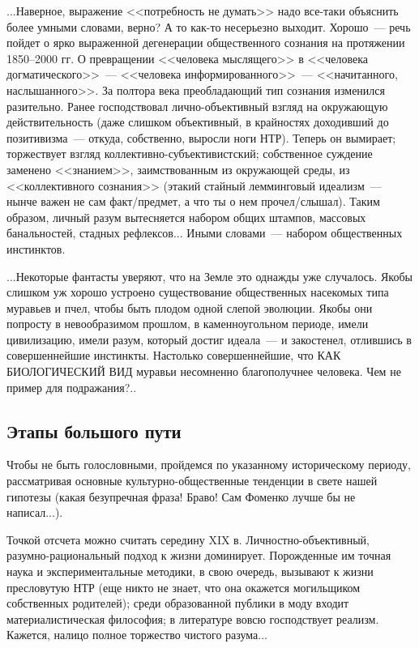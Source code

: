 \documentclass{scrbook}
\newcommand{\flqq}{<<}
\newcommand{\frqq}{>>}
\newcommand{\mdash}{~--- }
\newcommand{\ndash}{--}
\newcommand{\essaysection}[1]{\subsection*{#1}\nopagebreak}
\begin{document}
...Наверное, выражение {\flqq}потребность не думать{\frqq} надо все-таки объяснить более умными словами, верно? А то как-то несерьезно выходит. Хорошо{\mdash}речь пойдет о ярко выраженной дегенерации общественного сознания на протяжении 1850{\ndash}2000 гг. О превращении {\flqq}человека мыслящего{\frqq} в {\flqq}человека догматического{\frqq}{\mdash}{\flqq}человека информированного{\frqq}{\mdash}{\flqq}начитанного, наслышанного{\frqq}. За полтора века преобладающий тип сознания изменился разительно. Ранее господствовал лично-объективный взгляд на окружающую действительность (даже слишком объективный, в крайностях доходивший до позитивизма{\mdash}откуда, собственно, выросли ноги НТР). Теперь он вымирает; торжествует взгляд коллективно-субъективистский; собственное суждение заменено {\flqq}знанием{\frqq}, заимствованным из окружающей среды, из {\flqq}коллективного сознания{\frqq} (этакий стайный лемминговый идеализм{\mdash}нынче важен не сам факт/предмет, а что ты о нем прочел/слышал). Таким образом, личный разум вытесняется набором общих штампов, массовых банальностей, стадных рефлексов... Иными словами{\mdash}набором общественных инстинктов.

...Некоторые фантасты уверяют, что на Земле это однажды уже случалось. Якобы слишком уж хорошо устроено существование общественных насекомых типа муравьев и пчел, чтобы быть плодом одной слепой эволюции. Якобы они попросту в невообразимом прошлом, в каменноугольном периоде, имели цивилизацию, имели разум, который достиг идеала{\mdash}и закостенел, отлившись в совершеннейшие инстинкты. Настолько совершеннейшие, что КАК БИОЛОГИЧЕСКИЙ ВИД муравьи несомненно благополучнее человека. Чем не пример для подражания?..

\essaysection{Этапы большого пути}

Чтобы не быть голословными, пройдемся по указанному историческому периоду, рассматривая основные культурно-общественные тенденции в свете нашей гипотезы (какая безупречная фраза! Браво! Сам Фоменко лучше бы не написал...).

Точкой отсчета можно считать середину XIX в. Личностно-объективный, разумно-рациональный подход к жизни доминирует. Порожденные им точная наука и экспериментальные методики, в свою очередь, вызывают к жизни пресловутую НТР (еще никто не знает, что она окажется могильщиком собственных родителей); среди образованной публики в моду входит материалистическая философия; в литературе вовсю господствует реализм.
Кажется, налицо полное торжество чистого разума...
\end{document}
